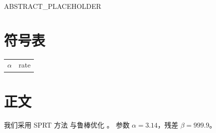 \documentclass{article}
\begin{document}
ABSTRACT_PLACEHOLDER

\section{符号表}
\begin{tabular}{ll}
$\alpha$ & rate \\
\end{tabular}

\section{正文}
我们采用 SPRT 方法 \cite{a2004,b2003} 与鲁棒优化 \cite[p.~3]{c}。
参数 $\alpha = 3.14$，残差 $\beta = 999.9$。

\end{document}
